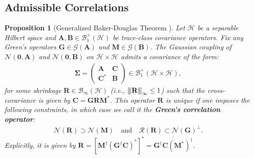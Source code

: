 \documentclass[noinfoline]{imsart}\setcounter{tocdepth}{2}
\newcommand{\m}[1]{\mathbf{#1}}
\renewcommand{\c}[1]{\mathcal{#1}}
\newcommand{\vertiii}[1]{{\left\vert\kern-0.25ex\left\vert\kern-0.25ex\left\vert #1 
    \right\vert\kern-0.25ex\right\vert\kern-0.25ex\right\vert}} %
\theoremstyle{plain}
\newtheorem{proposition}[theorem]{Proposition}
\begin{document}
\subsection{Admissible Correlations}

\begin{proposition}[Generalized Baker-Douglas Theorem \cite{douglas1966majorization, baker1970mutual}]
Let $\c{H}$ be a separable Hilbert space and $\m{A}, \m{B} \in \c{B}_{1}^{+}(\c{H})$ be trace-class covariance operators. Fix any Green's operators $\m{G} \in \c{G}(\m{A})$ and $\m{M} \in \c{G}(\m{B})$.
The Gaussian coupling of $\c{N}(\m{0}, \m{A})$ and $\c{N}(\m{0}, \m{B})$ on $\c{H} \times \c{H}$ admits a covariance of the form:
\begin{align*}
    \m{\Sigma} = 
    \left(
    \begin{array}{c|c}
    \m{A} & \m{C} \\
    \hline
    \m{C}^{*} & \m{B}
    \end{array}
    \right) \in \c{B}_{1}^{+}(\c{H} \times \c{H}),
\end{align*}
for some shrinkage $\m{R} \in \c{B}_{\infty}(\c{H})$ (i.e., $\vertiii{\m{R}}_{\infty} \le 1$) such that the cross-covariance is given by $\m{C} = \m{G} \m{R} \m{M}^*$. This operator $\m{R}$ is unique if one imposes the following constraints, in which case we call it the \textbf{Green's correlation operator}:
\begin{align*}
    \c{N}(\m{R}) \supset \c{N}(\m{M}) \quad \text{and} \quad \c{R}(\m{R}) \subset \c{N}(\m{G})^{\perp}.
\end{align*}
Explicitly, it is given by $\m{R} = \left[ \m{M}^{\dagger} (\m{G}^{\dagger} \m{C})^{*} \right]^{*} = \overline{\m{G}^{\dagger} \m{C} (\m{M}^{*})^{\dagger}}$.
\end{proposition}
\end{document}
